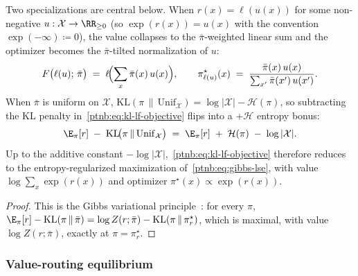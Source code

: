 Two specializations are central below. When $r(x) = \ell(u(x))$ for some non-negative $u :
    \mathcal{X} \to \RR_{\geq 0}$ (so $\exp(r(x)) = u(x)$ with the convention $\exp(-\infty) \coloneqq
    0$), the value collapses to the $\bar\pi$-weighted linear sum and the optimizer becomes the
$\bar\pi$-tilted normalization of $u$:
\begin{align}\label{ptnb:eq:kl-lf-linearized}
    F\bigl(\ell(u);\,\bar\pi\bigr) \;=\; \ell\!\Bigl(\sum_{x}\bar\pi(x)\,u(x)\Bigr),
    \qquad
    \pi_{\ell(u)}^\star(x) \;=\; \frac{\bar\pi(x)\,u(x)}{\sum_{x'}\bar\pi(x')\,u(x')}.
\end{align}
When $\bar\pi$ is uniform on $\mathcal{X}$, $\mathrm{KL}(\pi\,\|\,\mathrm{Unif}_\mathcal{X}) =
    \log|\mathcal{X}| - \mathcal{H}(\pi)$, so subtracting the KL penalty in~\eqref{ptnb:eq:kl-lf-objective}
flips into a $+\mathcal{H}$ entropy bonus:
\begin{align}
    \E_\pi[r] \;-\; \mathrm{KL}\!\bigl(\pi\,\|\,\mathrm{Unif}_\mathcal{X}\bigr)
    \;=\; \E_\pi[r] \;+\; \mathcal{H}(\pi) \;-\; \log|\mathcal{X}|.
\end{align}
Up to the additive constant $-\log|\mathcal{X}|$,~\eqref{ptnb:eq:kl-lf-objective} therefore reduces to
the entropy-regularized maximization of~\eqref{ptnb:eq:gibbs-lse}, with value $\log\sum_{x}\exp(r(x))$
and optimizer $\pi^\star(x) \propto \exp(r(x))$.

\begin{proof}
This is the Gibbs variational principle~\parencite{BoydVandenberghe2004}: for every $\pi$, $\E_\pi[r] -
    \mathrm{KL}(\pi\,\|\,\bar\pi) = \log Z(r;\bar\pi) - \mathrm{KL}(\pi\,\|\,\pi_r^\star)$, which is
maximal, with value $\log Z(r;\bar\pi)$, exactly at $\pi = \pi_r^\star$.
\end{proof}

\subsubsection{Value-routing equilibrium}\label{ptnb:app:attention-value-routing}

